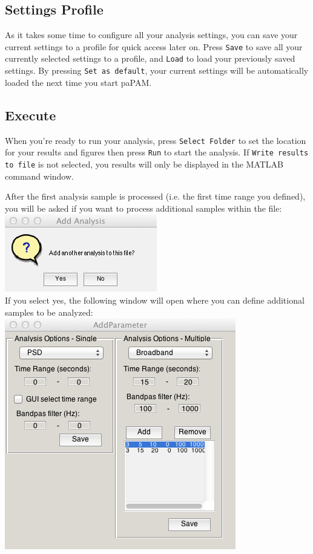 \documentclass[11pt]{report}
\begin{document}
\subsection{Settings Profile}
As it takes some time to configure all your analysis settings, you can save your current settings to a profile for quick access later on.  Press \texttt{Save} to save all your currently selected settings to a profile, and \texttt{Load} to load your previously saved settings.  By pressing \texttt{Set as default}, your current settings will be automatically loaded the next time you start paPAM.

\subsection{Execute} \label{Execute}

When you're ready to run your analysis, press \texttt{Select Folder} to set the location for your results and figures then press \texttt{Run} to start the analysis.  If \texttt{Write results to file} is not selected, you results will only be displayed in the MATLAB command window.

After the first analysis sample is processed (i.e. the first time range you defined), you will be asked if you want to process additional samples within the file:\\

\includegraphics[scale=0.6,clip = true,trim = 0 0 0 0]{4.png}\\

If you select yes, the following window will open where you can define  additional samples to be analyzed:\\

\includegraphics[scale=0.6,clip = true,trim = 0 0 0 0]{5.png}\\
\end{document}
